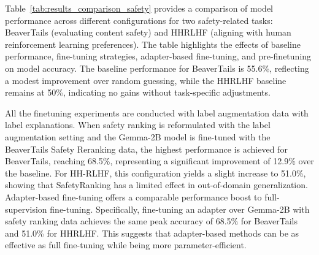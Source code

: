 \begin{table}[t!]
\vspace{-1em}
\centering
{}
\caption{Comparison of Results Across Different Configurations on the safety tasks.}
\label{tab:results_comparison_safety}
\vspace{-1.5em}
\end{table}

Table~\ref{tab:results_comparison_safety} provides a comparison of model performance across different configurations for two safety-related tasks: BeaverTails (evaluating content safety) and HHRLHF (aligning with human reinforcement learning preferences). The table highlights the effects of baseline performance, fine-tuning strategies, adapter-based fine-tuning, and pre-finetuning on model accuracy. The baseline performance for BeaverTails is 55.6\%, reflecting a modest improvement over random guessing, while the HHRLHF baseline remains at 50\%, indicating no gains without task-specific adjustments. 

All the finetuning experiments are conducted with label augmentation data with label explanations. When safety ranking is reformulated with the label augmentation setting and the Gemma-2B model is fine-tuned with the BeaverTails Safety Reranking data, the highest performance is achieved for BeaverTails, reaching 68.5\%, representing a significant improvement of 12.9\% over the baseline. For HH-RLHF, this configuration yields a slight increase to 51.0\%, showing that SafetyRanking has a limited effect in out-of-domain generalization. Adapter-based fine-tuning offers a comparable performance boost to full-supervision fine-tuning. Specifically, fine-tuning an adapter over Gemma-2B with safety ranking data achieves the same peak accuracy of 68.5\% for BeaverTails and 51.0\% for HHRLHF. This suggests that adapter-based methods can be as effective as full fine-tuning while being more parameter-efficient.

